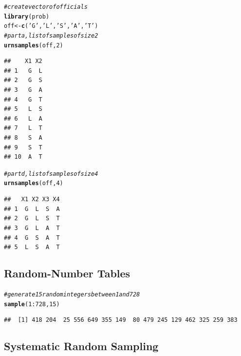 \documentclass{article}\usepackage[]{graphicx}\usepackage[]{color}
\makeatletter
\newcommand{\hlnum}[1]{\textcolor[rgb]{0.686,0.059,0.569}{#1}}%
\newcommand{\hlstr}[1]{\textcolor[rgb]{0.192,0.494,0.8}{#1}}%
\newcommand{\hlcom}[1]{\textcolor[rgb]{0.678,0.584,0.686}{\textit{#1}}}%
\newcommand{\hlopt}[1]{\textcolor[rgb]{0,0,0}{#1}}%
\newcommand{\hlstd}[1]{\textcolor[rgb]{0.345,0.345,0.345}{#1}}%
\newcommand{\hlkwb}[1]{\textcolor[rgb]{0.69,0.353,0.396}{#1}}%
\newcommand{\hlkwd}[1]{\textcolor[rgb]{0.737,0.353,0.396}{\textbf{#1}}}%
\newenvironment{kframe}{%
 \def\at@end@of@kframe{}%
 \ifinner\ifhmode%
  \def\at@end@of@kframe{\end{minipage}}%
  \begin{minipage}{\columnwidth}%
 \fi\fi%
 \def\FrameCommand##1{\hskip\@totalleftmargin \hskip-\fboxsep
 \colorbox{shadecolor}{##1}\hskip-\fboxsep
     \hskip-\linewidth \hskip-\@totalleftmargin \hskip\columnwidth}%
 \MakeFramed {\advance\hsize-\width
   \@totalleftmargin\z@ \linewidth\hsize
   \@setminipage}}%
 {\par\unskip\endMakeFramed%
 \at@end@of@kframe}
\newenvironment{knitrout}{}{} %
\makeatother
\begin{document}
\begin{knitrout}
\color{fgcolor}\begin{kframe}
\begin{alltt}
\hlcom{#create vector of officials}
\hlkwd{library}\hlstd{(prob)}
\hlstd{off} \hlkwb{<-} \hlkwd{c}\hlstd{(}\hlstr{'G'}\hlstd{,} \hlstr{'L'}\hlstd{,} \hlstr{'S'}\hlstd{,} \hlstr{'A'}\hlstd{,} \hlstr{'T'}\hlstd{)}
\hlcom{#part a, list of samples of size 2}
\hlkwd{urnsamples}\hlstd{(off,} \hlnum{2}\hlstd{)}
\end{alltt}
\begin{verbatim}
##    X1 X2
## 1   G  L
## 2   G  S
## 3   G  A
## 4   G  T
## 5   L  S
## 6   L  A
## 7   L  T
## 8   S  A
## 9   S  T
## 10  A  T
\end{verbatim}
\begin{alltt}
\hlcom{#part d, list of samples of size 4}
\hlkwd{urnsamples}\hlstd{(off,} \hlnum{4}\hlstd{)}
\end{alltt}
\begin{verbatim}
##   X1 X2 X3 X4
## 1  G  L  S  A
## 2  G  L  S  T
## 3  G  L  A  T
## 4  G  S  A  T
## 5  L  S  A  T
\end{verbatim}
\end{kframe}
\end{knitrout}

\subsection{Random-Number Tables}

\begin{knitrout}
\color{fgcolor}\begin{kframe}
\begin{alltt}
\hlcom{#generate 15 random integers between 1 and 728}
\hlkwd{sample}\hlstd{(}\hlnum{1}\hlopt{:}\hlnum{728}\hlstd{,} \hlnum{15}\hlstd{)}
\end{alltt}
\begin{verbatim}
##  [1] 418 204  25 556 649 355 149  80 479 245 129 462 325 259 383
\end{verbatim}
\end{kframe}
\end{knitrout}

\subsection{Systematic Random Sampling}
\end{document}
